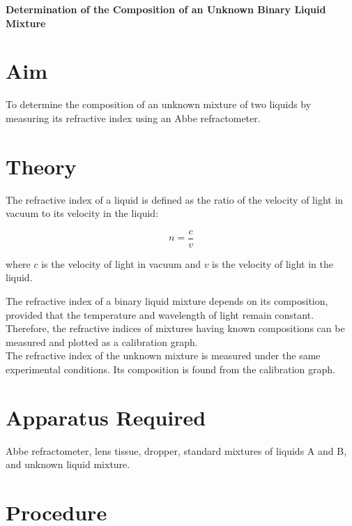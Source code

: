 \documentclass[12pt]{article}
\begin{document}
	
	\begin{center}
		\Large \textbf{Determination of the Composition of an Unknown Binary Liquid Mixture}\\
	\end{center}
	
	\section*{Aim}
	
	To determine the composition of an unknown mixture of two liquids by measuring its refractive index using an Abbe refractometer.
	
	\section*{Theory}
	
	The refractive index of a liquid is defined as the ratio of the velocity of light in vacuum to its velocity in the liquid:
	
	\[
	n = \frac{c}{v}
	\]
	
	where \(c\) is the velocity of light in vacuum and \(v\) is the velocity of light in the liquid.
	
	The refractive index of a binary liquid mixture depends on its composition, provided that the temperature and wavelength of light remain constant. Therefore, the refractive indices of mixtures having known compositions can be measured and plotted as a calibration graph. \\	
	The refractive index of the unknown mixture is measured under the same experimental conditions. Its composition is found from the calibration graph.
	
	\section*{Apparatus Required}
	
	Abbe refractometer, lens tissue, dropper, standard mixtures of liquids A and B, and unknown liquid mixture.
	
	\section*{Procedure}
	
\end{document}

